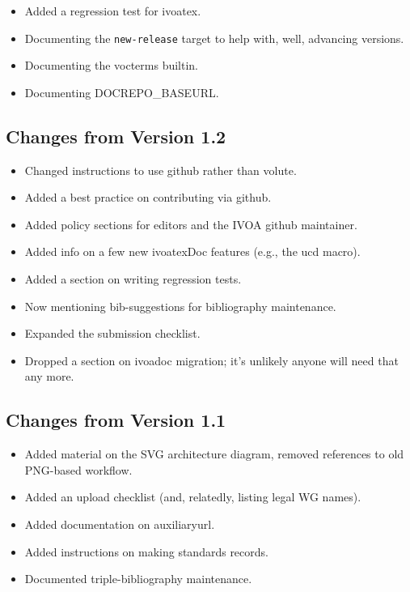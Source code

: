 \documentclass[11pt,a4paper]{ivoa}
\begin{document}
\begin{itemize}
\item Added a regression test for ivoatex.
\item Documenting the \verb|new-release| target to help with, well, advancing
versions.
\item Documenting the vocterms builtin.
\item Documenting DOCREPO\_BASEURL.
\end{itemize}


\subsection{Changes from Version 1.2}

\begin{itemize}
\item Changed instructions to use github rather than volute.
\item Added a best practice on contributing via github.
\item Added policy sections for editors and the IVOA github maintainer.
\item Added info on a few new ivoatexDoc features (e.g., the ucd macro).
\item Added a section on writing regression tests.
\item Now mentioning bib-suggestions for bibliography maintenance.
\item Expanded the submission checklist.
\item Dropped a section on ivoadoc migration; it's unlikely anyone
will need that any more.
\end{itemize}

\subsection{Changes from Version 1.1}

\begin{itemize}
\item Added material on the SVG architecture diagram, removed references
to old PNG-based workflow.
\item Added an upload checklist (and, relatedly, listing legal WG names).
\item Added documentation on auxiliaryurl.
\item Added instructions on making standards records.
\item Documented triple-bibliography maintenance.
\end{itemize}
\end{document}
